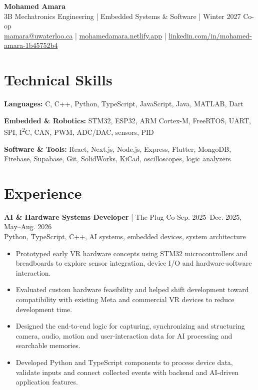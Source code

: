 \documentclass[letterpaper,10pt]{article}
\newcommand{\entry}[4]{
    \textbf{#1} \textnormal{| #2}
    \hfill {\small #3}\\[-1pt]
    {\small #4}
}
\begin{document}
\begin{center}
    {\fontsize{24}{26}\selectfont\bfseries Mohamed Amara}\\[3pt]

    {\small
    3B Mechatronics Engineering
    \enspace|\enspace
    Embedded Systems \& Software
    \enspace|\enspace
    Winter 2027 Co-op}\\[3pt]

    {\small
    \href{mailto:mamara@uwaterloo.ca}{mamara@uwaterloo.ca}
    \enspace|\enspace
    \href{https://mohamedamara.netlify.app}{mohamedamara.netlify.app}
    \enspace|\enspace
    \href{https://www.linkedin.com/in/mohamed-amara-1b45752b4}{linkedin.com/in/mohamed-amara-1b45752b4}}
\end{center}

\vspace{-8pt}

\section{Technical Skills}

\textbf{Languages:}
C, C++, Python, TypeScript, JavaScript, Java, MATLAB, Dart

\textbf{Embedded \& Robotics:}
STM32, ESP32, ARM Cortex-M, FreeRTOS, UART, SPI, I\textsuperscript{2}C, CAN, PWM, ADC/DAC, sensors, PID

\textbf{Software \& Tools:}
React, Next.js, Node.js, Express, Flutter, MongoDB, Firebase, Supabase, Git, SolidWorks, KiCad, oscilloscopes, logic analyzers

\section{Experience}

\entry
{AI \& Hardware Systems Developer}
{The Plug Co}
{Sep. 2025--Dec. 2025, May--Aug. 2026}
{Python, TypeScript, C++, AI systems, embedded devices, system architecture}

\begin{itemize}
    \item Prototyped early VR hardware concepts using STM32 microcontrollers and breadboards to explore sensor integration, device I/O and hardware-software interaction.
    \item Evaluated custom hardware feasibility and helped shift development toward compatibility with existing Meta and commercial VR devices to reduce development time.
    \item Designed the end-to-end logic for capturing, synchronizing and structuring camera, audio, motion and user-interaction data for AI processing and searchable memories.
    \item Developed Python and TypeScript components to process device data, validate inputs and connect collected events with backend and AI-driven application features.
\end{itemize}
\end{document}
